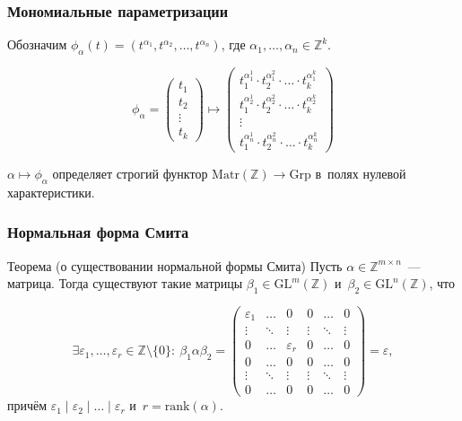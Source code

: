 \documentclass{beamer}
\newcommand{\Z}{\mathbb{Z}}
\newcommand{\GL}{\mathrm{GL}}
\newcommand{\divides}{\mid}
\begin{document}
\begin{frame}
  \frametitle{Мономиальные параметризации}

  Обозначим $\phi_\alpha(t) = (t^{\alpha_1}, t^{\alpha_2}, \ldots, t^{\alpha_n})$,
  где $\alpha_1, \ldots, \alpha_n \in \Z^k$.

  $$
    \phi_\alpha =
    \begin{pmatrix}
        t_1 \\
        t_2 \\
        \vdots \\
        t_k
    \end{pmatrix} \mapsto
    \begin{pmatrix}
        t_1^{\alpha_1^1} \cdot t_2^{\alpha_1^2} \cdot \ldots \cdot t_k^{\alpha_1^k} \\
        t_1^{\alpha_2^1} \cdot t_2^{\alpha_2^2} \cdot \ldots \cdot t_k^{\alpha_2^k} \\
        \vdots \\
        t_1^{\alpha_n^1} \cdot t_2^{\alpha_n^2} \cdot \ldots \cdot t_k^{\alpha_n^k}
    \end{pmatrix}
  $$

  $\alpha \mapsto \phi_\alpha$ определяет строгий функтор $\mathrm{Matr}(\Z) \rightarrow \mathrm{Grp}$
  в~полях нулевой характеристики.
\end{frame}

\begin{frame}
  \frametitle{Нормальная форма Смита}

  \begin{block}{Теорема (о существовании нормальной формы Смита)}
      Пусть $\alpha \in \Z^{m \times n}$~— матрица.
      Тогда существуют такие матрицы $\beta_1 \in \GL^m(\Z)$
      и~$\beta_2 \in \GL^n(\Z)$, что

      $$
      \exists \varepsilon_1, \ldots, \varepsilon_r \in \Z \setminus \{0\}{:} \
      \beta_1 \alpha \beta_2 =
      \begin{pmatrix}
        \varepsilon_1 & \ldots & 0             & 0      & \ldots & 0      \\
               \vdots & \ddots & \vdots        & \vdots & \ddots & \vdots \\
                    0 & \ldots & \varepsilon_r & 0      & \ldots & 0      \\
                    0 & \ldots & 0             & 0      & \ldots & 0      \\
               \vdots & \ddots & \vdots        & \vdots & \ddots & \vdots \\
                    0 & \ldots & 0             & 0      & \ldots & 0
      \end{pmatrix} = \varepsilon,
      $$
      причём $\varepsilon_1 \divides \varepsilon_2 \divides \ldots \divides \varepsilon_r$ и~$r = \mathrm{rank}(\alpha)$.
  \end{block}
\end{frame}
\end{document}
